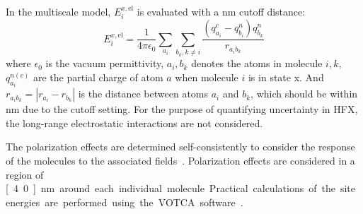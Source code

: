 \documentclass[%
 reprint,
superscriptaddress,
 amsmath,amssymb,
 aps,
prb,
floatfix
]{revtex4-2}
\begin{document}
In the multiscale model, $E_i^{x,\text{el}}$ is evaluated with a \unit[4]{nm} cutoff distance:
\begin{equation}
    E_i^{x,\text{el}} = \frac{1}{4 \pi \epsilon_0} \sum\limits_{a_i} \sum\limits_{b_k,k \neq i} \frac{(q^c_{a_i} - q^n_{b_i})q^n_{b_k}}{ r_{a_i b_k}} 
\end{equation}
where $\epsilon_0$ is the vacuum permittivity, $a_i, b_k$ denotes the atoms in molecule $i,k$, $q^{n(c)}_{a_i}$ are the partial charge of atom $a$ when molecule $i$ is in state x. And $r_{a_i b_k} = |r_{a_i} - r_{b_k}|$ is the distance between atoms $a_i$ and $b_k$, which should be within \unit[4]{nm} due to the cutoff setting. 
For the purpose of quantifying uncertainty in HFX, the long-range electrostatic interactions are not considered. 

The polarization effects are determined self-consistently to consider the response of the molecules to the associated fields~\cite{thole_molecular_1981}.
Polarization effects are considered in a region of \unit[4.0]{nm} around each individual molecule. Practical calculations of the site energies are performed using the VOTCA software~\cite{Baumeier2011,doi:10.1021/acs.jctc.8b00617,10.1063/1.5144277,Baumeier2024}.
\end{document}
